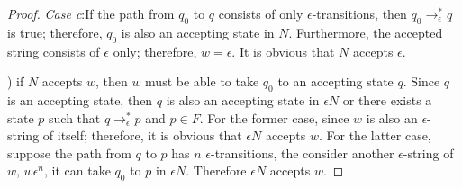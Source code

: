 \begin{proof}
\par \textit{Case c}:\quad If the path from \(q_0\)
to \(q\) consists of only \(\epsilon\)-transitions, then \(q_0
\to_\epsilon^* q\) is true; therefore, \(q_0\) is also an accepting
state in \(N\). Furthermore, the accepted string consists of \(\epsilon\) only;
therefore, \(w = \epsilon\). It is obvious that \(N\) accepts \(\epsilon\). 

\par {}) if \(N\) accepts \(w\), then \(w\) must be able to take \(q_0\) to an
accepting state \(q\). Since \(q\) is an accepting state, then \(q\)
is also an accepting state in \(\epsilon N\) or there exists a state 
\(p\) such that \(q \to_\epsilon^* p\) and \(p \in F\). For the former
case, since \(w\) is also an \(\epsilon\)-string of itself; therefore,
it is obvious that \(\epsilon N\) accepts \(w\). For the latter
case, suppose the path from \(q\) to \(p\) has \(n\)
\(\epsilon\)-transitions, the consider another \(\epsilon\)-string of
\(w\), \(w\epsilon^n\), it can take \(q_0\) to \(p\) in
\(\epsilon N\). Therefore \(\epsilon N\) accepts \(w\). 
\end{proof}